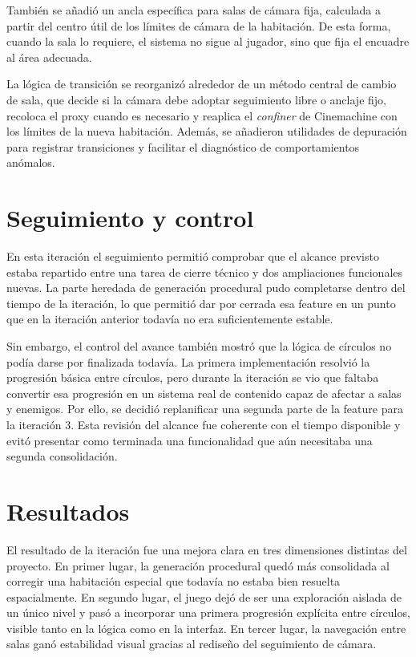 También se añadió un ancla específica para salas de cámara fija, calculada a partir del
centro útil de los límites de cámara de la habitación. De esta forma, cuando la sala lo
requiere, el sistema no sigue al jugador, sino que fija el encuadre al área adecuada.

La lógica de transición se reorganizó alrededor de un método central de cambio de sala, que
decide si la cámara debe adoptar seguimiento libre o anclaje fijo, recoloca el proxy cuando
es necesario y reaplica el \textit{confiner} de Cinemachine con los límites de la nueva
habitación. Además, se añadieron utilidades de depuración para registrar transiciones y
facilitar el diagnóstico de comportamientos anómalos.

\section{Seguimiento y control}
En esta iteración el seguimiento permitió comprobar que el alcance previsto estaba repartido
entre una tarea de cierre técnico y dos ampliaciones funcionales nuevas. La parte heredada de
generación procedural pudo completarse dentro del tiempo de la iteración, lo que permitió dar
por cerrada esa feature en un punto que en la iteración anterior todavía no era suficientemente
estable.

Sin embargo, el control del avance también mostró que la lógica de círculos no podía darse por
finalizada todavía. La primera implementación resolvió la progresión básica entre círculos, pero
durante la iteración se vio que faltaba convertir esa progresión en un sistema real de contenido
capaz de afectar a salas y enemigos. Por ello, se decidió replanificar una segunda parte de la
feature para la iteración 3. Esta revisión del alcance fue coherente con el tiempo disponible y
evitó presentar como terminada una funcionalidad que aún necesitaba una segunda consolidación.

\section{Resultados}
El resultado de la iteración fue una mejora clara en tres dimensiones distintas del
proyecto. En primer lugar, la generación procedural quedó más consolidada al corregir una
habitación especial que todavía no estaba bien resuelta espacialmente. En segundo lugar, el
juego dejó de ser una exploración aislada de un único nivel y pasó a incorporar una primera
progresión explícita entre círculos, visible tanto en la lógica como en la interfaz. En
tercer lugar, la navegación entre salas ganó estabilidad visual gracias al rediseño del
seguimiento de cámara.


